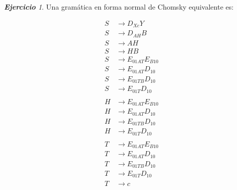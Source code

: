 \documentclass[12pt,spanish]{article}
\theoremstyle{definition}
\theoremstyle{remark}
\newtheorem{exercise}{\textbf{Ejercicio}}%
\begin{document}
\begin{exercise}
  Una gramática en forma normal de Chomsky equivalente es: \vspace{-7mm}
  
  \begin{multicols}{3}
    \begin{align*}
      S&\rightarrow D_{Xc}Y \\
      S&\rightarrow D_{AH}B \\
      S&\rightarrow AH \\
      S&\rightarrow HB \\
      S&\rightarrow E_{01AT}E_{B10} \\
      S&\rightarrow E_{01AT}D_{10} \\
      S&\rightarrow E_{01TB}D_{10} \\
      S&\rightarrow E_{01T}D_{10} \\
      ~ \\
      H&\rightarrow E_{01AT}E_{B10} \\
      H&\rightarrow E_{01AT}D_{10} \\
      H&\rightarrow E_{01TB}D_{10} \\
      H&\rightarrow E_{01T}D_{10} \\
      ~ \\
      T&\rightarrow E_{01AT}E_{B10} \\
      T&\rightarrow E_{01AT}D_{10} \\
      T&\rightarrow E_{01TB}D_{10} \\
      T&\rightarrow E_{01T}D_{10} \\
      T&\rightarrow c \\
      ~ \\ ~ \\ ~ \\ ~ \\ ~
    \end{align*}

    \columnbreak


\end{multicols}
\end{exercise}
\end{document}
